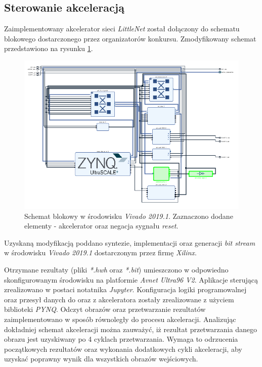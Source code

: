 \subsection{Sterowanie akceleracją}
\label{ch:sterowanie}
Zaimplementowany akcelerator sieci \emph{LittleNet} został dołączony do schematu blokowego dostarczonego przez organizatorów konkursu.
Zmodyfikowany schemat przedstawiono na rysunku \ref{fig:vivado}. 
\begin{figure}
    \centering
    \includegraphics[width=0.9\linewidth]{images/vivado.png}
    \caption{Schemat blokowy w środowisku \emph{Vivado 2019.1}. Zaznaczono dodane elementy - akcelerator oraz negacja sygnału \emph{reset}.}
    \label{fig:vivado}
\end{figure}

Uzyskaną modyfikacją poddano syntezie, implementacji oraz generacji \emph{bit stream} w środowisku \emph{Vivado 2019.1} dostarczonym przez firmę \emph{Xilinx}.

Otrzymane rezultaty (pliki \emph{*.hwh} oraz \emph{*.bit}) umieszczono w odpowiedno skonfigurowanym środowisku na platformie \emph{Avnet Ultra96 V2}.
Aplikacje sterującą zrealizowano w postaci notatnika \emph{Jupyter}.
Konfiguracja logiki programowalnej oraz przesył danych do oraz z akceleratora zostały zrealizowane z użyciem biblioteki \emph{PYNQ}. 
Odczyt obrazów oraz przetwarzanie rezultatów zaimplementowano w sposób równoległy do procesu akceleracji.
Analizując dokładniej schemat akceleracji można zauważyć, iż rezultat przetwarzania danego obrazu jest uzyskiwany po 4 cyklach przetwarzania.
Wymaga to odrzucenia początkowych rezultatów oraz wykonania dodatkowych cykli akceleracji, aby uzyskać poprawny wynik dla wszystkich obrazów wejściowych.



